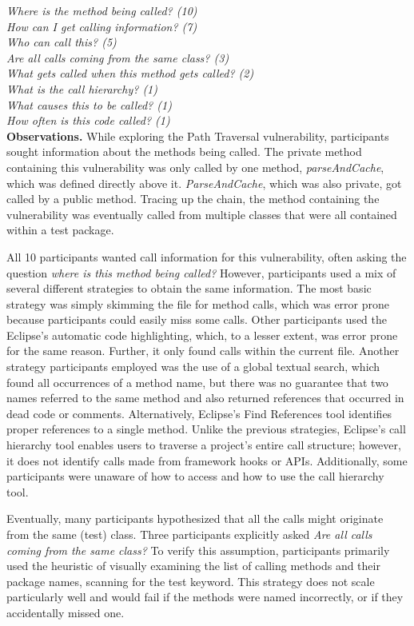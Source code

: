 \documentclass[conference]{IEEEtran}
\begin{document}
\noindent\emph{Where is the method being called? (10)} \\
\emph{How can I get calling information? (7)} \\
\emph{Who can call this? (5)} \\
\emph{Are all calls coming from the same class? (3)} \\
\emph{What gets called when this method gets called? (2)} \\
\emph{What is the call hierarchy? (1)} \\
\emph{What causes this to be called? (1)} \\
\emph{How often is this code called? (1)} \\


\noindent\textbf{Observations.}
While exploring the Path Traversal vulnerability, participants sought information about the methods being called. 
The private method containing this vulnerability was only called by one method, \textit{parseAndCache}, which was defined directly above it. \textit{ParseAndCache}, which was also private, got called by a public method. Tracing up the chain, the method containing the vulnerability was eventually called from multiple classes that were all contained within a test package.

All 10 participants wanted call information for this vulnerability, often asking the question \textit{where is this method being called?} 
However, participants used a mix of several different strategies to obtain the same information.
The most basic strategy was simply skimming the file for method calls, which was error prone because participants could easily miss some calls.
Other participants used the Eclipse's automatic code highlighting, which, to a lesser extent, was error prone for the same reason. Further, it only found calls within the current file.
Another strategy participants employed was the use of a global textual search, which found all occurrences of a method name, but there was no guarantee that two names referred to the same method and also returned references that occurred in dead code or comments.
Alternatively, Eclipse's Find References tool identifies proper references to a single method.
Unlike the previous strategies, Eclipse's call hierarchy tool enables users to traverse a project's entire call structure; however, it does not identify calls made from framework hooks or APIs.
Additionally, some participants were unaware of how to access and how to use the call hierarchy tool.

Eventually, many participants hypothesized that all the calls might originate from the same (test) class. Three participants explicitly asked \textit{Are all calls coming from the same class?} To verify this assumption, participants primarily used the heuristic of visually examining the list of calling methods and their package names, scanning for the test keyword. This strategy does not scale particularly well and would fail if the methods were named incorrectly, or if they accidentally missed one.
\\
\end{document}

